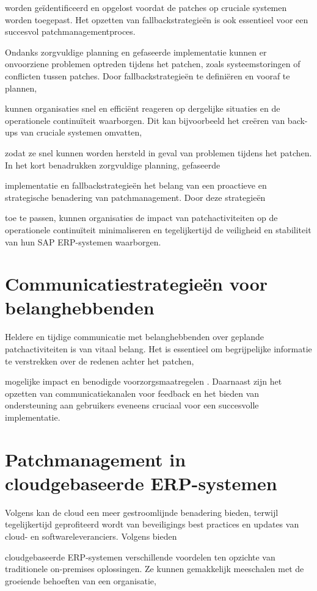 worden geïdentificeerd en opgelost voordat de patches op cruciale systemen worden toegepast. Het opzetten van fallbackstrategieën is ook essentieel voor een succesvol patchmanagementproces.

Ondanks zorgvuldige planning en gefaseerde implementatie kunnen er onvoorziene problemen optreden tijdens het patchen, zoals systeemstoringen of conflicten tussen patches. Door fallbackstrategieën te definiëren en vooraf te plannen,

kunnen organisaties snel en efficiënt reageren op dergelijke situaties en de operationele continuïteit waarborgen. Dit kan bijvoorbeeld het creëren van back-ups van cruciale systemen omvatten, 

zodat ze snel kunnen worden hersteld in geval van problemen tijdens het patchen. In het kort benadrukken zorgvuldige planning, gefaseerde

implementatie en fallbackstrategieën het belang van een proactieve en strategische benadering van patchmanagement. Door deze strategieën

toe te passen, kunnen organisaties de impact van patchactiviteiten op de operationele continuïteit minimaliseren en tegelijkertijd de veiligheid en stabiliteit van hun SAP ERP-systemen waarborgen.

\section{Communicatiestrategieën voor belanghebbenden}
Heldere en tijdige communicatie met belanghebbenden over geplande patchactiviteiten is van vitaal belang. Het is essentieel om begrijpelijke informatie te verstrekken over de redenen achter het patchen,

mogelijke impact en benodigde voorzorgsmaatregelen \autocite{Toren2019}. Daarnaast zijn het opzetten van communicatiekanalen voor feedback en het bieden van ondersteuning aan gebruikers eveneens cruciaal voor een succesvolle implementatie.


\section{Patchmanagement in cloudgebaseerde ERP-systemen}
Volgens \textcite{Forbes2021} kan de cloud een meer gestroomlijnde benadering bieden, terwijl tegelijkertijd geprofiteerd wordt van beveiligings best practices en updates van cloud- en softwareleveranciers. Volgens \textcite{Ruiter2024} bieden

cloudgebaseerde ERP-systemen verschillende voordelen ten opzichte van traditionele on-premises oplossingen. Ze kunnen gemakkelijk meeschalen met de groeiende behoeften van een organisatie, 

